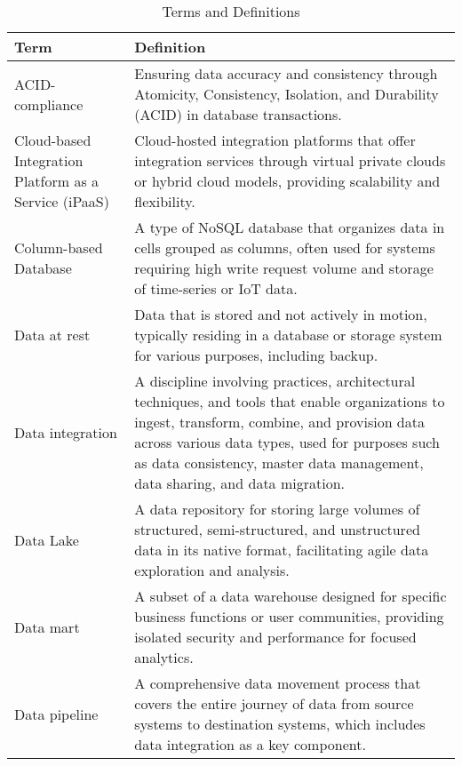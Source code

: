 \documentclass[12pt]{report} %
\begin{document}
	\begin{table}[h!]
		\centering
		\begin{tabular}{| m{5cm} | m{10cm} |}
			\hline
			\textbf{Term} & \textbf{Definition} \\
			\hline
			ACID-compliance & Ensuring data accuracy and consistency through Atomicity, Consistency, Isolation, and Durability (ACID) in database transactions. \\
			\hline
			Cloud-based Integration Platform as a Service (iPaaS) & Cloud-hosted integration platforms that offer integration services through virtual private clouds or hybrid cloud models, providing scalability and flexibility. \\
			\hline
			Column-based Database & A type of NoSQL database that organizes data in cells grouped as columns, often used for systems requiring high write request volume and storage of time-series or IoT data. \\
			\hline
			Data at rest & Data that is stored and not actively in motion, typically residing in a database or storage system for various purposes, including backup.\\
			\hline
			Data integration & A discipline involving practices, architectural techniques, and tools that enable organizations to ingest, transform, combine, and provision data across various data types, used for purposes such as data consistency, master data management, data sharing, and data migration.\\
			\hline
			Data Lake & A data repository for storing large volumes of structured, semi-structured, and unstructured data in its native format, facilitating agile data exploration and analysis.\\
			\hline
			 Data mart & A subset of a data warehouse designed for specific business functions or user communities, providing isolated security and performance for focused analytics. \\
			\hline
			 Data pipeline & A comprehensive data movement process that covers the entire journey of data from source systems to destination systems, which includes data integration as a key component. \\
			\hline
		\end{tabular}
	\caption{Terms and Definitions}
\end{table}
\end{document}
